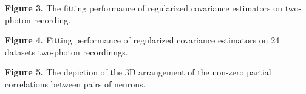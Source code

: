 \textbf{Figure 3.}{ 
The fitting performance of regularized covariance estimators on two-photon recording. 
}\label{fig:03}

\textbf{Figure 4.}{ 
Fitting performance of regularized covariance estimators on 24 datasets two-photon recordinngs.
}\label{fig:04}

\textbf{Figure 5.}{
The depiction of the 3D arrangement of the non-zero partial correlations between pairs of neurons.
}\label{fig:04}
